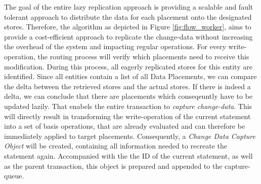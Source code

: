 The goal of the entire lazy replication approach is providing a scalable and fault tolerant approach to distribute the data for each placement onto the designated stores.
Therefore, the algorithm as depicted in Figure \ref{fig:flow_worker}, aims to provide a cost-efficient approach to replicate the change-data without increasing 
the overhead of the system and impacting regular operations. 
For every write-operation, the routing process will verify which placements need to receive this modification. During this process, all eagerly replicated stores for this entity
are identified. Since all entities contain a list of all Data Placements, we can compare the delta between the retrieved stores and the actual stores. 
If there is indeed a delta, we can conclude that there are placements which conseqeuntly have to be updated lazily. 
That enabels the entire transaction to \emph{capture change-data}. This will directly result in transforming the write-operation of the current statement into a set of basis 
operations, that are already evaluated and can therefore be immediately applied to target placements. Consequently, a \emph{Change Data Capture Object} will be created, 
containing all information needed to recreate the statement again. Accompanied with the the ID of the current statement, as well as the parent transaction, this object is prepared
and appended to the capture-queue.

